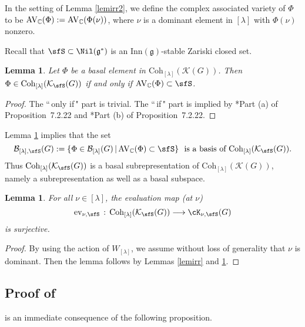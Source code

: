 \documentclass[12pt,a4paper]{amsart}
\newcommand{\AV}{\mathrm{AV}}
\newcommand{\CK}{{\mathcal {K}}}
\newcommand{\g}{\mathfrak g}
\newcommand{\be}{\begin {equation}}
\newcommand{\ee}{\end {equation}}
\numberwithin{equation}{section}
\newtheorem{lem}[thm]{Lemma}
\theoremstyle{remark}
\def\Coh{\mathrm{Coh}}
\def\Inn{\mathrm{Inn}}
\newcommand{\Lam}{{[\lambda]}}
\newcommand{\Grt}{\cK}
\begin{document}
In the setting of Lemma \ref{lemirr2}, we define the complex associated variety of $\Phi$ to be $ \AV_\C(\Phi):= \AV_\C(\Phi(\nu))$, where $\nu$ is a dominant element in $\Lam$ with $\Phi(\nu)$ nonzero.

Recall that $\sfS\subset \Nil(\g^*)$ is an $\Inn(\g)$-stable Zariski closed set.

\begin{lem}\label{lemirr11}
Let $\Phi$ be a basal element in $\Coh_{[\lambda]}(\CK(G))$. Then  $\Phi \in \Coh_{[\lambda]}(\CK_\sfS(G))$ if and only if $\AV_\C(\Phi)\subset \sfS$.
         \end{lem}
\begin{proof}
The ``$\,$only if$\,$" part is trivial. The ``$\,$if$\,$" part is implied by \cite{Vg}*{Part (a) of Proposition~7.2.22} and
\cite{Vg}*{Part (b) of Proposition~7.2.22}.
\end{proof}

Lemma \ref{lemirr11} implies that the set
\be\label{basiss}
   \mathcal B_{\Lam,\sfS}(G):=\{\Phi\in \mathcal B_\Lam(G)\,|\,\AV_\C(\Phi)\subset \sfS\}
  \  \textrm{
    is a basis of $ \Coh_{[\lambda]}(\CK_\sfS(G))$.}
    \ee
     Thus $ \Coh_{[\lambda]}(\CK_\sfS(G))$ is a basal subrepresentation of $ \Coh_{[\lambda]}(\CK(G))$, namely a subrepresentation as well as a basal subspace.

\begin{lem}\label{sur111}
For all $\nu\in\Lam$, the evaluation map  (at $\nu$)
  \[
    \mathrm{ev}_{\nu , \sfS} \, :\, \Coh_{[\lambda]}(\CK_\sfS(G)) \longrightarrow \Grt_{\nu, \sfS}(G)
  \]
 is surjective.
\end{lem}
\begin{proof}
By using the action of $W_\Lam$, we assume without loss of generality that $\nu$ is dominant. Then the lemma follows by Lemmas \ref{lemirr} and \ref{lemirr11}.
\end{proof}



\subsection{Proof of }
   is an immediate consequence of the following proposition.
\end{document}
